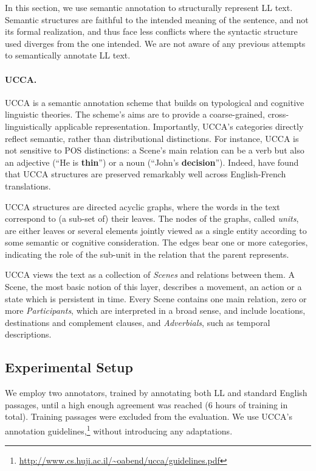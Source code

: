 \documentclass[letter,11pt]{article}
\begin{document}
In this section, we use semantic annotation to structurally
represent LL text. Semantic structures are faithful to the intended
meaning of the sentence, and not its formal realization, and thus face
less conflicts where the syntactic structure used diverges from
the one intended. We are not aware of any previous attempts to semantically
annotate LL text.

\paragraph{UCCA.}\label{sec:ucca}
UCCA is a semantic annotation scheme that builds on
typological and cognitive linguistic theories.
The scheme's aims are to provide a coarse-grained, cross-linguistically
applicable representation.
Importantly, UCCA's categories directly reflect semantic, rather than
distributional distinctions.
For instance, UCCA is not sensitive to POS distinctions:
a Scene's main relation can be a verb but also an adjective
(``He is {\bf thin}'') or a noun (``John's {\bf decision}'').
Indeed,  have found that UCCA structures are
preserved remarkably well across English-French translations. 

UCCA structures are directed acyclic graphs, where the words in the text 
correspond to (a sub-set of) their leaves.
The nodes of the graphs, called {\it units}, are either leaves or several elements jointly
viewed as a single entity according to some semantic or cognitive consideration.
The edges bear one or more categories, indicating the role of 
the sub-unit in the relation that the parent represents.

UCCA views the text as a collection of {\it Scenes} and relations between them.
A Scene, the most basic notion of this layer, describes a movement, 
an action or a state which is persistent in time.
Every Scene contains one main relation, 
zero or more {\it Participants}, 
which are interpreted in a broad sense, 
and include locations, destinations and complement clauses,
and {\it Adverbials}, such as temporal descriptions.

\subsection{Experimental Setup}
We employ two annotators, trained by annotating both LL and standard English
passages, until a high enough agreement was reached (6 hours of training in total).
Training passages were excluded from the evaluation.
We use UCCA's annotation guidelines,\footnote{\url{http://www.cs.huji.ac.il/~oabend/ucca/guidelines.pdf}} without introducing any adaptations.
\end{document}
